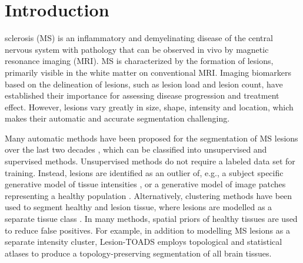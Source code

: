 \section{Introduction}

sclerosis (MS) is an inflammatory and demyelinating disease of the central
nervous system with pathology that can be observed in vivo by magnetic resonance
imaging (MRI). MS is characterized by the formation of lesions, primarily
visible in the white matter on conventional MRI. Imaging biomarkers based on the
delineation of lesions, such as lesion load and lesion count, have established
their importance for assessing disease progression and treatment effect.
However, lesions vary greatly in size, shape, intensity and location, which
makes their automatic and accurate segmentation challenging.


Many automatic methods have been proposed for the segmentation of MS
\mbox{lesions} over the last two decades \cite{garcia2013review}, which can be
classified into unsupervised and supervised methods. Unsupervised methods do not
require a labeled data set for training. Instead, lesions are identified as an
outlier of, e.g., a subject specific generative model of tissue intensities
\cite{vanleemput2001,tomas2015,schmidt2012automated,roura2015}, or a generative
model of image patches representing a healthy population \cite{weiss2013}.
Alternatively, clustering methods have been used to segment healthy and lesion
tissue, where lesions are modelled as a separate tissue class
\cite{shiee2010topology,sudre2015}.
In many methods, spatial priors of healthy tissues are used to reduce false
positives. For example, in addition to modelling MS lesions as a separate
intensity cluster, Lesion-TOADS \cite{shiee2010topology} employs topological and
statistical atlases to produce a topology-preserving segmentation of all brain
tissues.

